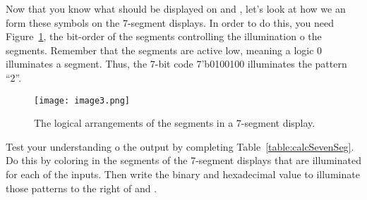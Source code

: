 Now that you know what should be displayed on   
and , let's look at how we an form these symbols on the
7-segment displays.  In order to do this, you need Figure~\ref{fig:calcSevenSeg},
the bit-order of the segments controlling the illumination o the segments. Remember
that the segments are active low, meaning a logic 0 illuminates a
segment. Thus, the 7-bit code 7'b0100100 illuminates the pattern ``2''.

\begin{figure}[ht]
\texttt{[image:  image3.png]}
\caption{The logical arrangements of the segments in a 7-segment display.}
\label{fig:calcSevenSeg}
\end{figure}

Test your understanding o the  output by completing
Table~\ref{table:calcSevenSeg}. Do this by coloring in the segments of the 
7-segment displays that are illuminated for each of the inputs. Then write 
the binary and hexadecimal value to illuminate those patterns to the 
right of  and .

